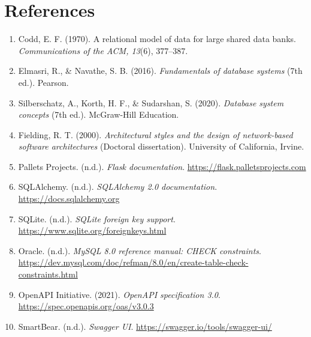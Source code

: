 \documentclass[11pt]{article}
\renewcommand{\_}{\oldus\allowbreak}
\begin{document}
\section*{References}

\begin{enumerate}[itemsep=0.2em]
  \item Codd, E. F. (1970). A relational model of data for large shared data banks. \textit{Communications of the ACM, 13}(6), 377--387.
  \item Elmasri, R., \& Navathe, S. B. (2016). \textit{Fundamentals of database systems} (7th ed.). Pearson.
  \item Silberschatz, A., Korth, H. F., \& Sudarshan, S. (2020). \textit{Database system concepts} (7th ed.). McGraw-Hill Education.
  \item Fielding, R. T. (2000). \textit{Architectural styles and the design of network-based software architectures} (Doctoral dissertation). University of California, Irvine.
  \item Pallets Projects. (n.d.). \textit{Flask documentation}. \url{https://flask.palletsprojects.com}
  \item SQLAlchemy. (n.d.). \textit{SQLAlchemy 2.0 documentation}. \url{https://docs.sqlalchemy.org}
  \item SQLite. (n.d.). \textit{SQLite foreign key support}. \url{https://www.sqlite.org/foreignkeys.html}
  \item Oracle. (n.d.). \textit{MySQL 8.0 reference manual: CHECK constraints}. \url{https://dev.mysql.com/doc/refman/8.0/en/create-table-check-constraints.html}
  \item OpenAPI Initiative. (2021). \textit{OpenAPI specification 3.0}. \url{https://spec.openapis.org/oas/v3.0.3}
  \item SmartBear. (n.d.). \textit{Swagger UI}. \url{https://swagger.io/tools/swagger-ui/}
\end{enumerate}
\end{document}
